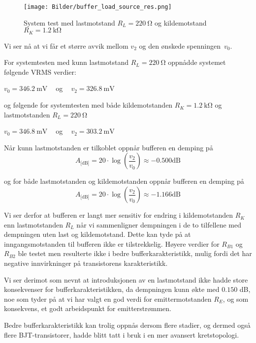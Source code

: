 \begin{figure}[H]
    \centering 
    \texttt{[image: Bilder/buffer\_load\_source\_res.png]}
    \caption{System test med lastmotstand $R_L = \SI{220}{\ohm}$ og kildemotstand $R_K = \SI{1.2}{\kilo\ohm}$}
    \label{fig:buffer_load_source_res_plot}
\end{figure}

Vi ser nå at vi får et større avvik mellom $v_2$ og den ønskede spenningen $v_0$. 

For systemtesten med kunn lastmotstand $R_L = \SI{220}{\ohm}$ oppnådde systemet følgende VRMS verdier:
\begin{center}
    $v_0 = \SI{346.2}{\milli\volt}\:\:\:\:$ og $\:\:\:\:v_2 = \SI{326.8}{\milli\volt}$ 
\end{center}

og følgende for systemtesten med både kildemotstanden $R_K = \SI{1.2}{\kilo\ohm}$ og
lastmotstanden $R_L = \SI{220}{\ohm}$

\begin{center}
    $v_0 = \SI{346.8}{\milli\volt}\:\:\:\:$ og $\:\:\:\:v_2 = \SI{303.2}{\milli\volt}$ 
\end{center}

Når kunn lastmotstanden er tilkoblet oppnår bufferen en demping på 
\[
    A_\text{[dB]} = 20 \cdot \log{\left(\frac{v_2}{v_0}\right)} \approx -0.500 \text{dB}
\]

og for både lastmotstanden og kildemotstanden oppnår bufferen en demping på
\[
    A_\text{[dB]} = 20 \cdot \log{\left(\frac{v_2}{v_0}\right)} \approx -1.166 \text{dB}
\]

Vi ser derfor at bufferen er langt mer sensitiv for endring i kildemotstanden $R_K$ enn lastmotstanden
$R_L$ når vi sammenligner dempningen i de to tilfellene med dempningen uten last og kildemotstand. 
Dette kan tyde på at inngangsmotstanden til bufferen ikke er tilstrekkelig. Høyere verdier for 
$R_{B1}$ og $R_{B2}$ ble testet men resulterte ikke i bedre bufferkarakteristikk, mulig fordi det har 
negative innvirkninger på transistorens karakteristikk.

Vi ser derimot som nevnt at introduksjonen av en lastmotstand ikke hadde store konsekvenser for 
bufferkarakteristikken, da dempningen kunn økte med $0.150$ dB, noe som tyder på at vi har valgt en 
god verdi for emittermotstanden $R_E$, og som konsekvens, et godt arbeidspunkt for emitterstrømmen.

Bedre bufferkarakteristikk kan trolig oppnås dersom flere stadier, og dermed også flere BJT-transistorer,
hadde blitt tatt i bruk i en mer avansert kretstopologi.

